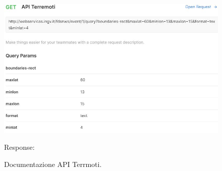 \begin{figure}[h!]
	\centering
	\includegraphics[width=1\linewidth]{./Conclusione/ImageFiles/APITerremotiRequest.JPG}
	
	Response:
	
	\caption{Documentazione API Terrmoti.}
	\label{fig:APITerremoti}
\end{figure}

\clearpage
